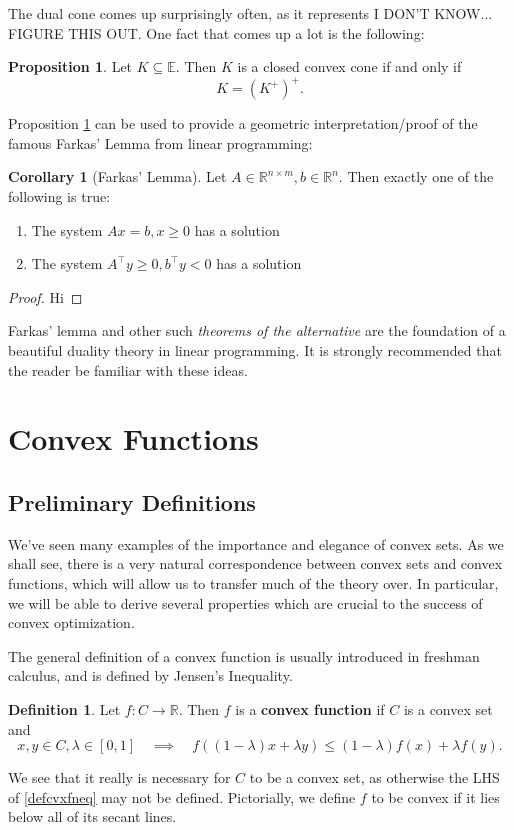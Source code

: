 \documentclass[11pt]{article}
\numberwithin{equation}{section}
\theoremstyle{definition}
\newtheorem{corollary}[theorem]{Corollary}
\newtheorem{proposition}[theorem]{Proposition}
\newtheorem{definition}[theorem]{Definition}%
\newcommand{\bE}{\mathbb{E}}
\newcommand{\bR}{\mathbb{R}}
\begin{document}
The dual cone comes up surprisingly often, as it represents I DON'T KNOW... FIGURE THIS OUT. One fact that comes up a lot is the following:
\begin{proposition}
    \label{prpccciffselfdual}
    Let $K\subseteq\bE$. Then $K$ is a closed convex cone if and only if
    \begin{equation}
        K=(K^+)^+.
    \end{equation}
\end{proposition}
Proposition \ref{prpccciffselfdual} can be used to provide a geometric interpretation/proof of the famous Farkas' Lemma from linear programming:
\begin{corollary}[Farkas' Lemma]
    Let $A\in\bR^{n\times m}, b\in\bR^n$. Then exactly one of the following is true:
    \begin{enumerate}[label=(\roman*)]
        \item The system $Ax=b, x\ge 0$ has a solution
        \item The system $A^\top y\ge 0, b^\top y<0$ has a solution
    \end{enumerate}
\end{corollary}
\begin{proof}
Hi
\end{proof}
Farkas' lemma and other such \textit{theorems of the alternative} are the foundation of a beautiful duality theory in linear programming. It is strongly recommended that the reader be familiar with these ideas.
\section{Convex Functions}
\subsection{Preliminary Definitions}
We've seen many examples of the importance and elegance of convex sets. As we shall see, there is a very natural correspondence between convex sets and convex functions, which will allow us to transfer much of the theory over. In particular, we will be able to derive several properties which are crucial to the success of convex optimization.

The general definition of a convex function is usually introduced in freshman calculus, and is defined by Jensen's Inequality.
\begin{definition}
    Let $f:C\to\bR$. Then $f$ is a \textbf{convex function} if $C$ is a convex set and
    \begin{equation}
        \label{defcvxfneq}
        x, y\in C, \lambda\in[0, 1]\quad\implies\quad f((1-\lambda)x+\lambda y)\le (1-\lambda)f(x)+\lambda f(y).
    \end{equation}
\end{definition}
We see that it really is necessary for $C$ to be a convex set, as otherwise the LHS of \ref{defcvxfneq} may not be defined. Pictorially, we define $f$ to be convex if it lies below all of its secant lines.
\end{document}
